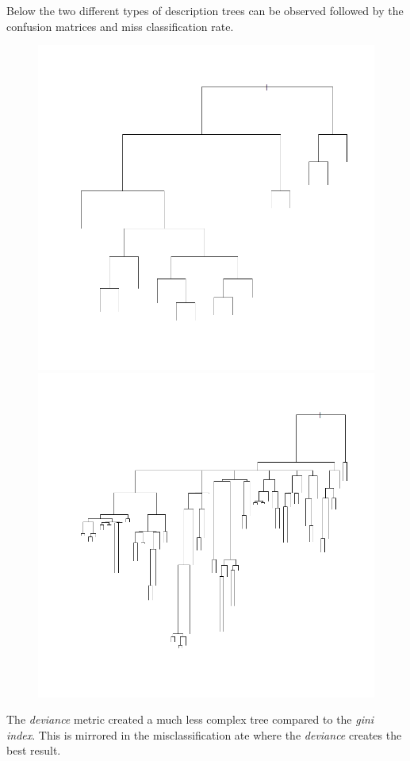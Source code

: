 \documentclass[a4paper,12pt]{article}
\begin{document}
Below the two different types of description trees can be observed followed by the confusion matrices and miss classification rate.
\begin{figure}[H]
\centering
\begin{minipage}[]{0.49\textwidth}
  \includegraphics[width=\textwidth]{figures/deviance_table.png}  
 \end{minipage}
 \begin{minipage}[]{0.49\textwidth}
  \includegraphics[width=\textwidth]{figures/gini_table.png}  
 \end{minipage}
\end{figure}
The \textit{deviance} metric created a much less complex tree compared to the \textit{gini index}. This is mirrored in the misclassification ate where the \textit{deviance} creates the best result.
\end{document}
